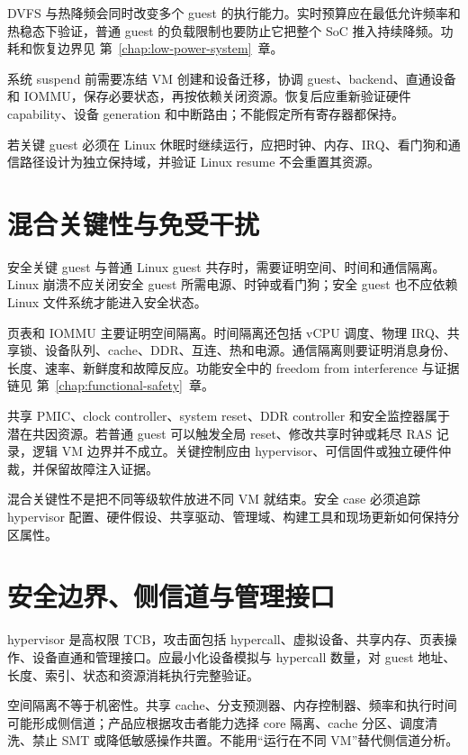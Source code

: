 DVFS 与热降频会同时改变多个 guest 的执行能力。实时预算应在最低允许频率和热稳态下验证，普通 guest 的负载限制也要防止它把整个 SoC 推入持续降频。功耗和恢复边界见 \mbox{第~\ref{chap:low-power-system}~章}。

系统 suspend 前需要冻结 VM 创建和设备迁移，协调 guest、backend、直通设备和 IOMMU，保存必要状态，再按依赖关闭资源。恢复后应重新验证硬件 capability、设备 generation 和中断路由；不能假定所有寄存器都保持。

若关键 guest 必须在 Linux 休眠时继续运行，应把时钟、内存、IRQ、看门狗和通信路径设计为独立保持域，并验证 Linux resume 不会重置其资源。

\section{混合关键性与免受干扰}

安全关键 guest 与普通 Linux guest 共存时，需要证明空间、时间和通信隔离。Linux 崩溃不应关闭安全 guest 所需电源、时钟或看门狗；安全 guest 也不应依赖 Linux 文件系统才能进入安全状态。

页表和 IOMMU 主要证明空间隔离。时间隔离还包括 vCPU 调度、物理 IRQ、共享锁、设备队列、cache、DDR、互连、热和电源。通信隔离则要证明消息身份、长度、速率、新鲜度和故障反应。功能安全中的 freedom from interference 与证据链见 \mbox{第~\ref{chap:functional-safety}~章}。

共享 PMIC、clock controller、system reset、DDR controller 和安全监控器属于潜在共因资源。若普通 guest 可以触发全局 reset、修改共享时钟或耗尽 RAS 记录，逻辑 VM 边界并不成立。关键控制应由 hypervisor、可信固件或独立硬件仲裁，并保留故障注入证据。

混合关键性不是把不同等级软件放进不同 VM 就结束。安全 case 必须追踪 hypervisor 配置、硬件假设、共享驱动、管理域、构建工具和现场更新如何保持分区属性。

\section{安全边界、侧信道与管理接口}

hypervisor 是高权限 TCB，攻击面包括 hypercall、虚拟设备、共享内存、页表操作、设备直通和管理接口。应最小化设备模拟与 hypercall 数量，对 guest 地址、长度、索引、状态和资源消耗执行完整验证。

空间隔离不等于机密性。共享 cache、分支预测器、内存控制器、频率和执行时间可能形成侧信道；产品应根据攻击者能力选择 core 隔离、cache 分区、调度清洗、禁止 SMT 或降低敏感操作共置。不能用“运行在不同 VM”替代侧信道分析。

